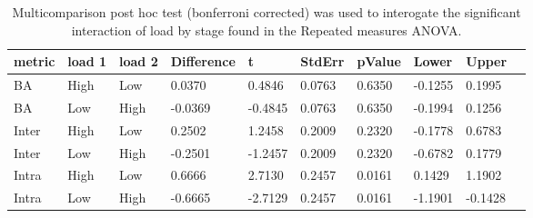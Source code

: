 \begin{table}
\centering
\begin{tabular}[0.2em]{@{}llllllllll@{}}\toprule
metric & load 1 & load 2 & Difference & t & StdErr & pValue & Lower & Upper\\\toprule[0.2em]
BA & High & Low & 0.0370 & 0.4846 & 0.0763 & 0.6350 & -0.1255 & 0.1995 \\\midrule
BA & Low & High & -0.0369 & -0.4845 & 0.0763 & 0.6350 & -0.1994 & 0.1256 \\\midrule
Inter & High & Low & 0.2502 & 1.2458 & 0.2009 & 0.2320 & -0.1778 & 0.6783 \\\midrule
Inter & Low & High & -0.2501 & -1.2457 & 0.2009 & 0.2320 & -0.6782 & 0.1779 \\\midrule
Intra & High & Low & 0.6666 & 2.7130 & 0.2457 & 0.0161 & 0.1429 & 1.1902 \\\midrule
Intra & Low & High & -0.6665 & -2.7129 & 0.2457 & 0.0161 & -1.1901 & -0.1428 \\\bottomrule[0.2em]
\end{tabular}
\caption{Multicomparison post hoc test (bonferroni corrected) was used to interogate the significant interaction of load by stage found in the Repeated measures ANOVA.\label{tabel:tbl_RMABA2_PH_inter}}
\end{table}
